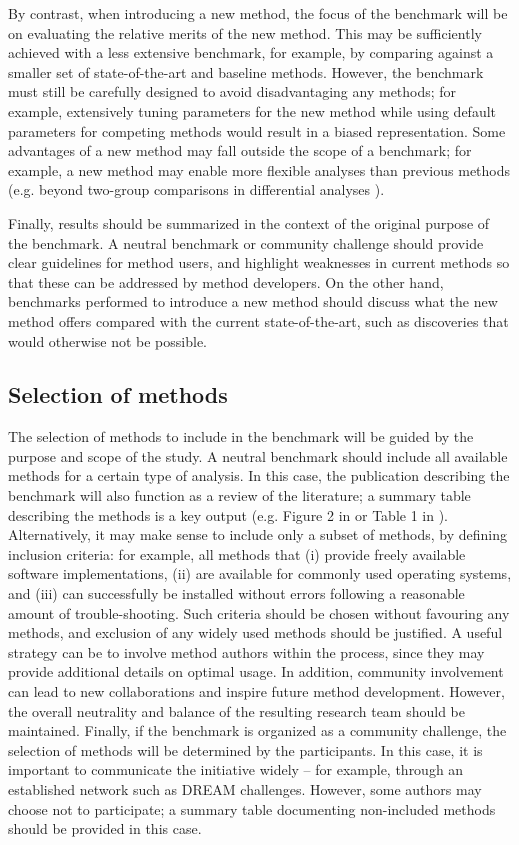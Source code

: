 By contrast, when introducing a new method, the focus of the benchmark will be on evaluating the relative merits of the new method. This may be sufficiently achieved with a less extensive benchmark, for example, by comparing against a smaller set of state-of-the-art and baseline methods. However, the benchmark must still be carefully designed to avoid disadvantaging any methods; for example, extensively tuning parameters for the new method while using default parameters for competing methods would result in a biased representation. Some advantages of a new method may fall outside the scope of a benchmark; for example, a new method may enable more flexible analyses than previous methods (e.g. beyond two-group comparisons in differential analyses \cite{weber_diffcytdifferentialdiscovery_2019}).

Finally, results should be summarized in the context of the original purpose of the benchmark. A neutral benchmark or community challenge should provide clear guidelines for method users, and highlight weaknesses in current methods so that these can be addressed by method developers. On the other hand, benchmarks performed to introduce a new method should discuss what the new method offers compared with the current state-of-the-art, such as discoveries that would otherwise not be possible.

\subsection{Selection of methods}

The selection of methods to include in the benchmark will be guided by the purpose and scope of the study. A neutral benchmark should include all available methods for a certain type of analysis. In this case, the publication describing the benchmark will also function as a review of the literature; a summary table describing the methods is a key output (e.g. Figure 2 in \cite{saelens_comparisonsinglecelltrajectory_2019} or Table 1 in \cite{weber_comparisonclusteringmethods_2016}). Alternatively, it may make sense to include only a subset of methods, by defining inclusion criteria: for example, all methods that (i) provide freely available software implementations, (ii) are available for commonly used operating systems, and (iii) can successfully be installed without errors following a reasonable amount of trouble-shooting. Such criteria should be chosen without favouring any methods, and exclusion of any widely used methods should be justified. A useful strategy can be to involve method authors within the process, since they may provide additional details on optimal usage. In addition, community involvement can lead to new collaborations and inspire future method development. However, the overall neutrality and balance of the resulting research team should be maintained. Finally, if the benchmark is organized as a community challenge, the selection of methods will be determined by the participants. In this case, it is important to communicate the initiative widely -- for example, through an established network such as DREAM challenges. However, some authors may choose not to participate; a summary table documenting non-included methods should be provided in this case.


